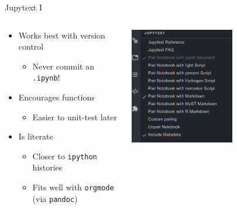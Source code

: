 \documentclass[bigger,unknownkeysallowed,aspectratio=169,red,colorblocks]{beamer}
\begin{document}
\begin{frame}[label={sec:org7048cc1},fragile]{Jupytext I}
 \begin{columns}
\begin{column}{0.4\columnwidth}
\begin{itemize}
\item Works best with version control
\begin{itemize}
\item Never commit an \texttt{.ipynb}!
\end{itemize}
\item Encourages functions
\begin{itemize}
\item Easier to unit-test later
\end{itemize}
\item Is literate
\begin{itemize}
\item Closer to \texttt{ipython} histories
\item Fits well with \texttt{orgmode} (via \texttt{pandoc})
\end{itemize}
\end{itemize}
\end{column}

\begin{column}{0.6\columnwidth}
\begin{center}
\includegraphics[width=0.6\textwidth]{images/A_screenshot/2020-09-20_07-11-59_screenshot.png}
\end{center}
\end{column}
\end{columns}
\end{frame}
\end{document}
